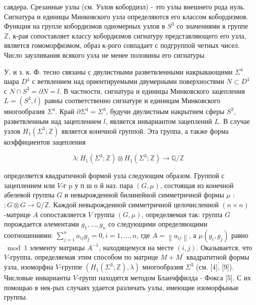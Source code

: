 \documentclass[10pt]{article}
\begin{document}
савдера. Срезанные узлы (см. Узлов кобордизл) - это узлы внешнего рода нуль. Сигнатура и единицы Минковского узла определяются его классом кобордизмов. Функция на групле кобордизмов одномерных узлов в $S^{3}$ со значениями в группе $\mathbb{Z}$, к-рая сопоставляет классу кобордизмов сигнатуру представляющего его узла, является гомоморфизмом, образ к-рого совпадает с подгруппой четных чисел. Число заузливания всякого узла не менее половины его сигнатуры.



У. и з. к. Ф. тесно связаны с двулистными разветвленными накрывающими $\Sigma^{4}$ шара $D^{4}$ с ветвлением над ориентируемыми двумерными поверхностями $N \subset D^{4}$ с $N \cap S^{3}=\partial N=l$. В частности, сигнатура и единицы Минковского зацепления $L=\left(S^{3}, l\right)$ равны соответственно сигнатуре и единицам Минковского многообразия $\Sigma^{4}$. Край $\partial \Sigma^{4}=\Sigma^{3}$, будучи двулистным накрытием сферы $S^{3}$, разветвленным над зацеплением $l$, является инвариантом зацеплений $L$. В случае узлов $H_{1}\left(\Sigma^{3} ; \mathbb{Z}\right)$ является конечной группой. Эта группа, а также форма коэффициентов зацепления



\[

\lambda: H_{1}\left(\Sigma^{3} ; \mathbb{Z}\right) \otimes H_{1}\left(\Sigma^{3} ; \mathbb{Z}\right) \longrightarrow \mathbb{Q} / \mathbb{Z}

\]



определяется квадратичной формой узла следующим образом. Группой с зацеплением или $V$-г $\mathrm{p}$ у п ш о й наз. пара $(G, \mu)$, состоящая из конечной абелевой группы $G$ и невырожденной билинейной симметричной формы $\mu$ : $: G \otimes G \rightarrow \mathbb{Q} / \mathbb{Z}$. Каждой невырожденной симметричной целочисленной $(n \times n)$-матрице $A$ сопоставляется $V$ группа $(G, \mu)$, определяемая так: группа $G$ порождается әлементами $g_{1}, \ldots, g_{n}$ со следующими определяющими соотношениями: $\sum_{j=1}^{n} a_{i j} g_{j}=0, i=1, \ldots, n$, где $A=\left\|a_{i j}\right\|$, а $\mu\left(g_{i}, g_{j}\right)$ равно $\bmod 1$ элементу матрицы $A^{-1}$, находящемуся на месте $(i, j)$. Оказывается, что $V$-группа, определяемая этим способом по матрице $M+M^{\prime}$ квадратитной формы узла, изоморфна $V$-группе $\left(H_{1}\left(\Sigma^{3} ; \mathbb{Z}\right), \lambda\right)$ многообразия $\Sigma^{3}$ (см. [4], [9]). Числовые инварианты $V$-групп находятся методом Бланчффилда - Фокса [5]. С их помощью в нек-рых случаях удается различать узлы, имеющие изоморфыные группы.
\end{document}
